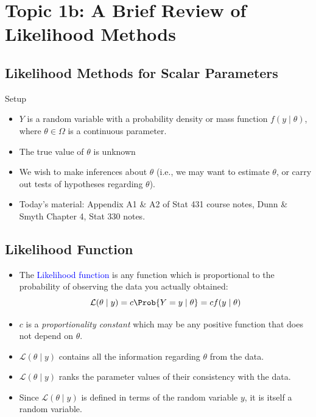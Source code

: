 \documentclass[oneside]{book}\usepackage[]{graphicx}\usepackage[svgnames]{xcolor}
\newcommand{\makeheading}[2]%
{%
\begin{center}%
    \makebox[\linewidth]{\raisebox{-.5ex}[0cm][0cm]{\stackanchor{\textcolor{Gray}{\textsc{#1}}}{\scriptsize\itshape\printyearoff#2}\;}\color{Crimson!50}\hrulefill}%
\end{center}%
}%
\begin{document}
\makeheading{Week 2}{\daterange{2021-09-13}{2021-09-17}}
\section*{Topic 1b: A Brief Review of Likelihood Methods}
\subsection*{Likelihood Methods for Scalar Parameters}
\begin{Regular}{Setup}
      \begin{itemize}
            \item $ Y $ is a random variable with a probability density or mass function $ f(y\mid \theta) $, where
                  $ \theta\in\Omega $ is a continuous parameter.
            \item The true value of $ \theta $ is unknown
            \item We wish to make inferences about $ \theta $ (i.e., we may want to estimate $ \theta $, or carry out
                  tests of hypotheses regarding $ \theta $).
      \end{itemize}
\end{Regular}
\begin{itemize}
      \item Today's material: Appendix A1 \& A2 of Stat 431 course notes, Dunn \& Smyth Chapter 4, Stat 330 notes.
\end{itemize}
\subsection*{Likelihood Function}
\begin{itemize}
      \item The \textcolor{Blue}{Likelihood function} is any function which is proportional to the probability of
            observing the data you actually obtained:
            \[ \mathcal{L}(\theta\mid y)=c\Prob{Y=y\mid\theta}=cf(y\mid\theta) \]
      \item $ c $ is a \emph{proportionality constant} which may be any positive function that does not
            depend on $ \theta $.
      \item $ \mathcal{L}(\theta\mid y) $ contains all the information regarding $ \theta $ from the data.
      \item $ \mathcal{L}(\theta\mid y) $ ranks the parameter values of their consistency with the data.
      \item Since $ \mathcal{L}(\theta\mid y) $ is defined in terms of the random variable $ y $, it is
            itself a random variable.
\end{itemize}
\end{document}
